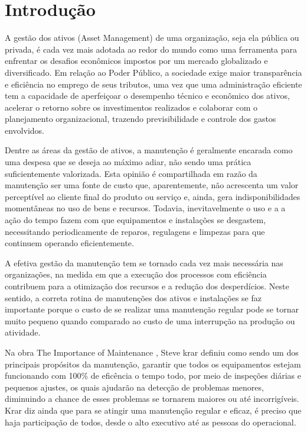 \chapter{Introdução}
\label{cap-introducao}

A gestão dos ativos (Asset Management) de uma organização, seja ela pública ou privada, é cada vez mais adotada ao redor do mundo como uma ferramenta para enfrentar os desafios econômicos impostos por um mercado globalizado e diversificado. Em relação ao Poder Público, a sociedade exige maior transparência e eficiência no emprego de seus tributos, uma vez que uma administração eficiente tem a capacidade de aperfeiçoar o desempenho técnico e econômico dos ativos, acelerar o retorno sobre os investimentos realizados e colaborar com o planejamento organizacional, trazendo previsibilidade e controle dos gastos envolvidos. 

Dentre as áreas da gestão de ativos, a manutenção é geralmente encarada como uma despesa que se deseja ao máximo adiar, não sendo uma prática suficientemente valorizada. Esta opinião é compartilhada em razão da manutenção ser uma fonte de custo que, aparentemente, não acrescenta um valor perceptível ao cliente final do produto ou serviço e, ainda, gera indisponibilidades momentâneas no uso de bens e recursos. Todavia, inevitavelmente o uso e a a ação do tempo fazem com que equipamentos e instalações se desgastem, necessitando periodicamente de reparos, regulagens e limpezas para que continuem operando eficientemente.

A efetiva gestão da manutenção tem se tornado cada vez mais necessária nas organizações, na medida em que a execução dos processos com eficiência contribuem para a otimização dos recursos e a redução dos desperdícios.  Neste sentido, a correta rotina de manutenções dos ativos e instalações se faz importante porque o custo de se realizar uma manutenção regular pode se tornar muito pequeno quando comparado ao custo de uma interrupção na produção ou atividade.

Na obra The Importance of Maintenance , Steve krar \cite{krar2009} definiu como sendo um dos principais propósitos da manutenção, garantir que todos os equipamentos estejam funcionando com 100\% de eficência o tempo todo, por meio de inspeções diárias e pequenos ajustes, os quais ajudarão na detecção de problemas menores, diminuindo a chance de esses problemas se tornarem maiores ou até incorrigíveis. Krar diz ainda que para se atingir uma manutenção regular e eficaz, é preciso que haja participação de todos, desde o alto executivo até as pessoas do operacional.

